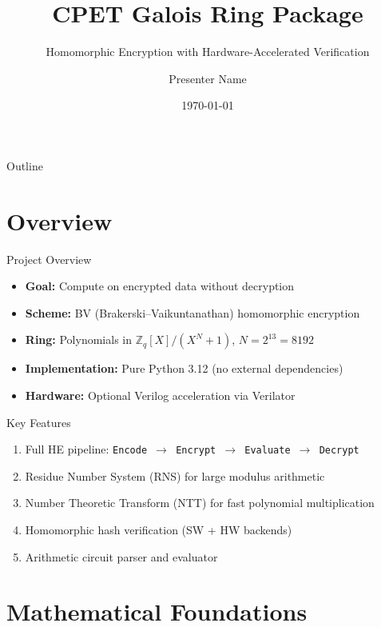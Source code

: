 \documentclass[aspectratio=169, 11pt]{beamer}
\title{CPET Galois Ring Package}
\subtitle{Homomorphic Encryption with Hardware-Accelerated Verification}
\author{Presenter Name}
\date{\today}
\begin{document}
\begin{frame}
\titlepage
\end{frame}

\begin{frame}{Outline}
\tableofcontents
\end{frame}

\section{Overview}

\begin{frame}{Project Overview}
\begin{itemize}
    \item \textbf{Goal:} Compute on encrypted data without decryption
    \item \textbf{Scheme:} BV (Brakerski--Vaikuntanathan) homomorphic encryption
    \item \textbf{Ring:} Polynomials in $\mathbb{Z}_q[X]/(X^N+1)$, \; $N = 2^{13} = 8192$
    \item \textbf{Implementation:} Pure Python 3.12 (no external dependencies)
    \item \textbf{Hardware:} Optional Verilog acceleration via Verilator
\end{itemize}

\vspace{0.5em}
\begin{block}{Key Features}
\begin{enumerate}
    \item Full HE pipeline: \texttt{Encode $\to$ Encrypt $\to$ Evaluate $\to$ Decrypt}
    \item Residue Number System (RNS) for large modulus arithmetic
    \item Number Theoretic Transform (NTT) for fast polynomial multiplication
    \item Homomorphic hash verification (SW + HW backends)
    \item Arithmetic circuit parser and evaluator
\end{enumerate}
\end{block}
\end{frame}

\section{Mathematical Foundations}
\end{document}
